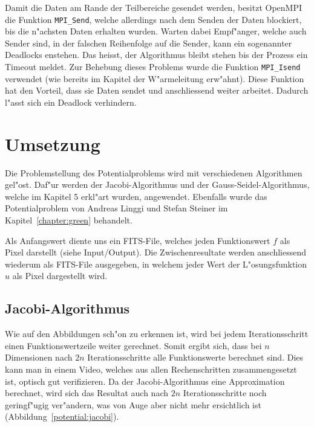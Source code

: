 \begin{refsection}
Damit die Daten am Rande der Teilbereiche gesendet werden,
besitzt OpenMPI die Funktion \texttt{MPI\_Send},
welche allerdings nach dem Senden
der Daten blockiert, bis die n"achsten Daten erhalten wurden. Warten
dabei Empf"anger, welche auch Sender sind, in der falschen Reihenfolge
auf die Sender, kann ein sogenannter Deadlocks enstehen. Das heisst, der
Algorithmus bleibt stehen bis der Prozess ein Timeout meldet. Zur Behebung
dieses Problems wurde die Funktion \texttt{MPI\_Isend} verwendet (wie bereits im
Kapitel der W"armeleitung erw"ahnt). Diese Funktion hat den Vorteil,
dass sie Daten sendet und anschliessend weiter arbeitet. Dadurch l"asst
sich ein Deadlock verhindern. 
		
\section{Umsetzung}
Die Problemstellung des Potentialproblems wird mit verschiedenen
Algorithmen gel"ost. Daf"ur werden der Jacobi-Algorithmus und der
Gauss-Seidel-Algorithmus, welche im Kapitel 5 erkl"art wurden,
angewendet. Ebenfalls wurde das Potentialproblem von Andreas Linggi
und Stefan Steiner im Kapitel~\ref{chapter:green} behandelt.

Als Anfangswert diente uns ein FITS-File, welches jeden
Funktionswert $f$ als Pixel darstellt (siehe Input/Output). Die
Zwischenresultate werden anschliessend wiederum als FITS-File ausgegeben,
in welchem jeder Wert der L"osungsfunktion $u$ als Pixel dargestellt
wird.

\subsection{Jacobi-Algorithmus}
Wie auf den Abbildungen sch"on zu erkennen ist, wird bei jedem
Iterationsschritt einen Funktionswertzeile weiter gerechnet. Somit
ergibt sich, dass bei $n$ Dimensionen nach $2n$ Iterationsschritte alle
Funktionswerte berechnet sind. Dies kann man in einem Video, welches aus
allen Rechenschritten zusammengesetzt ist, optisch gut verifizieren. Da
der Jacobi-Algorithmus eine Approximation berechnet, wird sich das
Resultat auch nach $2n$ Iterationsschritte noch geringf"ugig ver"andern,
was von Auge aber nicht mehr ersichtlich ist
(Abbildung~\ref{potential:jacobi}). 


\end{refsection}

